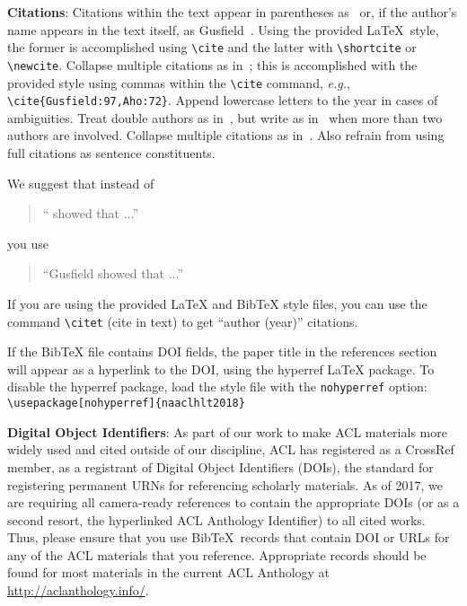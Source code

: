 \documentclass[11pt,a4paper]{article}
\begin{document}
{\bf Citations}: Citations within the text appear in parentheses
as~\cite{Gusfield:97} or, if the author's name appears in the text
itself, as Gusfield~.
Using the provided \LaTeX\ style, the former is accomplished using
{\small\verb|\cite|} and the latter with {\small\verb|\shortcite|} or {\small\verb|\newcite|}. Collapse multiple citations as in~\cite{Gusfield:97,Aho:72}; this is accomplished with the provided style using commas within the {\small\verb|\cite|} command, {\em e.g.}, {\small\verb|\cite{Gusfield:97,Aho:72}|}. Append lowercase letters to the year in cases of ambiguities.  
 Treat double authors as
in~\cite{Aho:72}, but write as in~\cite{Chandra:81} when more than two
authors are involved. Collapse multiple citations as
in~\cite{Gusfield:97,Aho:72}. Also refrain from using full citations
as sentence constituents.

We suggest that instead of
\begin{quote}
  ``\cite{Gusfield:97} showed that ...''
\end{quote}
you use
\begin{quote}
``Gusfield    showed that ...''
\end{quote}

If you are using the provided \LaTeX{} and Bib\TeX{} style files, you
can use the command \verb|\citet| (cite in text)
to get ``author (year)'' citations.

If the Bib\TeX{} file contains DOI fields, the paper
title in the references section will appear as a hyperlink
to the DOI, using the hyperref \LaTeX{} package.
To disable the hyperref package, load the style file
with the \verb|nohyperref| option: \\{\small
\verb|\usepackage[nohyperref]{naaclhlt2018}|}


\textbf{Digital Object Identifiers}:  As part of our work to make ACL
materials more widely used and cited outside of our discipline, ACL
has registered as a CrossRef member, as a registrant of Digital Object
Identifiers (DOIs), the standard for registering permanent URNs for
referencing scholarly materials.  As of 2017, we are requiring all
camera-ready references to contain the appropriate DOIs (or as a
second resort, the hyperlinked ACL Anthology Identifier) to all cited
works.  Thus, please ensure that you use Bib\TeX\ records that contain
DOI or URLs for any of the ACL materials that you reference.
Appropriate records should be found for most materials in the current
ACL Anthology at \url{http://aclanthology.info/}.
\end{document}
